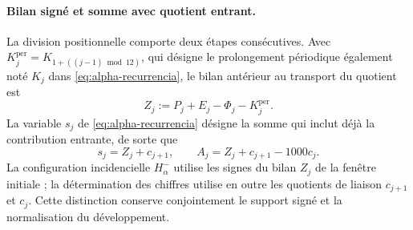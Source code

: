 \paragraph{Bilan signé et somme avec quotient entrant.}
\label{ampl-alfa-z-s-aclaracion}
La division positionnelle comporte deux étapes consécutives. Avec
\(K_j^{\mathrm{per}}=K_{1+((j-1)\bmod12)}\), qui désigne le
prolongement périodique également noté \(K_j\) dans
\eqref{eq:alpha-recurrencia}, le bilan antérieur au transport du
quotient est
\[
 Z_j:=P_j+E_j-\Phi_j-K_j^{\mathrm{per}}.
\]
La variable $s_j$ de \eqref{eq:alpha-recurrencia} désigne la somme qui
inclut déjà la contribution entrante, de sorte que
\[
 s_j=Z_j+c_{j+1},\qquad
 A_j=Z_j+c_{j+1}-1000c_j.
\]
La configuration incidencielle
$H^-_\alpha$ utilise les signes du bilan $Z_j$ de la fenêtre initiale ;
la détermination des chiffres utilise en outre les quotients de liaison
$c_{j+1}$ et $c_j$. Cette distinction conserve conjointement le support
signé et la normalisation du développement.
